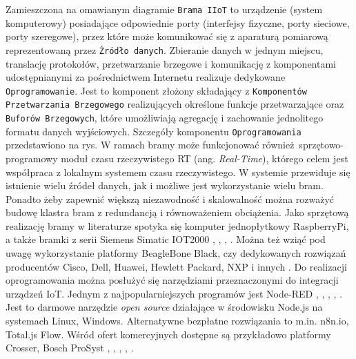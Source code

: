 \documentclass[a4paper, 12pt, twoside]{article}
\begin{document}
Zamieszczona na omawianym diagramie \texttt{Brama IIoT} to urządzenie (system komputerowy)
posiadające odpowiednie porty (interfejsy fizyczne, porty sieciowe, porty szeregowe),
przez które może komunikować się z aparaturą pomiarową reprezentowaną przez
\texttt{Źródło danych}. Zbieranie danych w jednym miejscu, translację protokołów,
przetwarzanie brzegowe i komunikację z komponentami udostępnianymi za pośrednictwem
Internetu realizuje dedykowane \texttt{Oprogramowanie}.
Jest to komponent złożony składający z \texttt{Komponentów Przetwarzania Brzegowego}
realizujących określone funkcje przetwarzające oraz \texttt{Buforów Brzegowych},
które umożliwiają agregację i zachowanie jednolitego formatu danych wyjściowych.
Szczegóły komponentu \texttt{Oprogramowania}
przedstawiono na rys. 
W ramach bramy może funkcjonować również sprzętowo-programowy moduł
czasu rzeczywistego RT (ang. \emph{Real-Time}), którego celem jest współpraca
z lokalnym systemem czasu rzeczywistego. W systemie przewiduje się istnienie wielu źródeł
danych, jak i możliwe jest wykorzystanie wielu bram. Ponadto żeby zapewnić większą niezawodność i skalowalność
można rozważyć budowę klastra bram z redundancją i równoważeniem obciążenia.
Jako sprzętową realizację bramy w literaturze spotyka się komputer jednopłytkowy
RaspberryPi, a także bramki z serii Siemens Simatic IOT2000
\cite{iiot-opensource-gateway}, \cite{design-impl-node-gateway},
\cite{low-cost-esp32-pi-node-red-scada}, \cite{modbus-iot-gateway}. Można też
wziąć pod uwagę wykorzystanie platformy BeagleBone Black, czy dedykowanych rozwiązań
producentów Cisco, Dell, Huawei, Hewlett Packard, NXP i innych \cite{gateways}.
Do realizacji oprogramowania można posłużyć się narzędziami przeznaczonymi do
integracji urządzeń IoT. Jednym z najpopularniejszych programów jest
Node-RED \cite{flow-programming}, \cite{iot-gateway-medical-and-industrial},
\cite{design-impl-node-gateway}, \cite{iiot-opensource-gateway}, \cite{low-cost-esp32-pi-node-red-scada}.
Jest to darmowe narzędzie \emph{open source} działające w środowisku Node.js na
systemach Linux, Windows. Alternatywne bezpłatne rozwiązania to m.in. n8n.io, Total.js Flow.
Wśród ofert komercyjnych dostępne są przykładowo platformy Crosser, Bosch ProSyst
\cite{node-red}, \cite{n8n}, \cite{total-js-flow}, \cite{crosser}, \cite{gateways}.
\end{document}

